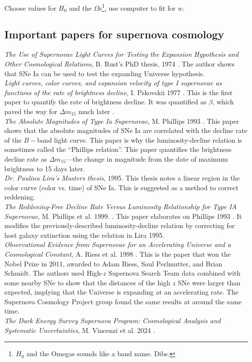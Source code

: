 Choose values for $H_{0}$ and the $\Omega$s\footnote{$H_{0}$ and the Omegas sounds like a band name. Dibs.}, use computer to fit for $w$. 

\subsection{Important papers for supernova cosmology}

\textit{The Use of Supernovae Light Curves for Testing the Expansion Hypothesis and Other Cosmological Relations}, B. Rust's PhD thesis, 1974 \cite{Rust1974}. The author shows that SNe Ia can be used to test the expanding Universe hypothesis.\\

\noindent\textit{Light curves, color curves, and expansion velocity of type I supernovae as functions of the rate of brightness decline}, I. Pskovskii 1977 \cite{Pskovskii1977}. This is the first paper to quantify the rate of brightness decline. It was quantified as $\beta$, which paved the way for $\Delta m_{15}$ much later \cite{Phillips1993}. \\

\noindent\textit{The Absolute Magnitudes of Type Ia Supernovae}, M. Phillips 1993 \cite{Phillips1993}. This paper shows that the absolute magnitudes of SNe Ia are correlated with the decline rate of the $B-$band light curve. This paper is why the luminosity-decline relation is sometimes called the ``Phillips relation''. This paper quantifies the brightness decline rate as $\Delta m_{15}$---the change in magnitude from the date of maximum brightness to 15 days later.\\

\noindent\textit{Dr. Paulina Lira's Masters thesis}, 1995. This thesis notes a linear region in the color curve (color vs. time) of SNe Ia. This is suggested as a method to correct reddening. \\

\noindent\textit{The Reddening-Free Decline Rate Versus Luminosity Relationship for Type IA Supernovae}, M. Phillips et al. 1999. \cite{Phillips1999}. This paper elaborates on Phillips 1993 \cite{Phillips1993}. It modifies the previously-described luminosity-decline relation by correcting for host galaxy extinction using the relation in Lira 1995.\\

\noindent\textit{Observational Evidence from Supernovae for an Accelerating Universe and a Cosmological Constant}, A. Riess et al. 1998 \cite{Riess1998}. This is the paper that won the Nobel Prize in 2011, awarded to Adam Riess, Saul Perlmutter, and Brian Schmidt. The authors used High-$z$ Supernova Search Team data combined with some nearby SNe to show that the distances of the high $z$ SNe were larger than expected, implying that the Universe is expanding at an accelerating rate. The Supernova Cosmology Project group found the same results at around the same time.\\

\noindent\textit{The Dark Energy Survey Supernova Program: Cosmological Analysis and Systematic Uncertainties}, M. Vincenzi et al. 2024 \cite{vincenzi2024}.